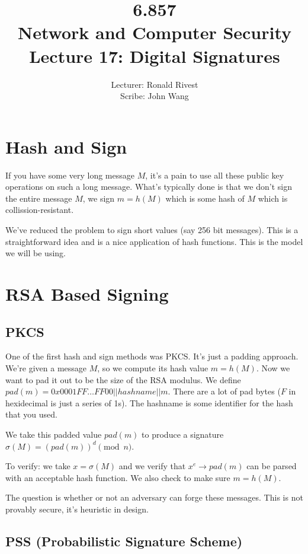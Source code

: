 \documentclass[psamsfonts]{amsart}
\title{6.857 \\
Network and Computer Security \\
Lecture 17: Digital Signatures}
\author{Lecturer: Ronald Rivest\\
Scribe: John Wang}
\begin{document}
\maketitle

\section{Hash and Sign}

If you have some very long message $M$, it's a pain to use all these public key operations on such a long message. What's typically done is that we don't sign the entire message $M$, we sign $m = h(M)$ which is some hash of $M$ which is collission-resistant.

We've reduced the problem to sign short values (say 256 bit messages). This is a straightforward idea and is a nice application of hash functions. This is the model we will be using.

\section{RSA Based Signing}

\subsection{PKCS}

One of the first hash and sign methods was PKCS. It's just a padding approach. We're given a message $M$, so we compute its hash value $m = h(M)$. Now we want to pad it out to be the size of the RSA modulus. We define $pad(m) = 0x0001FF \ldots FF 00 || hashname || m$. There are a lot of pad bytes ($F$ in hexidecimal is just a series of 1s). The hashname is some identifier for the hash that you used.

We take this padded value $pad(m)$ to produce a signature $\sigma(M) = (pad(m))^d \pmod{n}$.

To verify: we take $x = \sigma(M)$ and we verify that $x^e \to pad(m)$ can be parsed with an acceptable hash function. We also check to make sure $m = h(M)$.

The question is whether or not an adversary can forge these messages. This is not provably secure, it's heuristic in design.

\subsection{PSS (Probabilistic Signature Scheme)}
\end{document}
